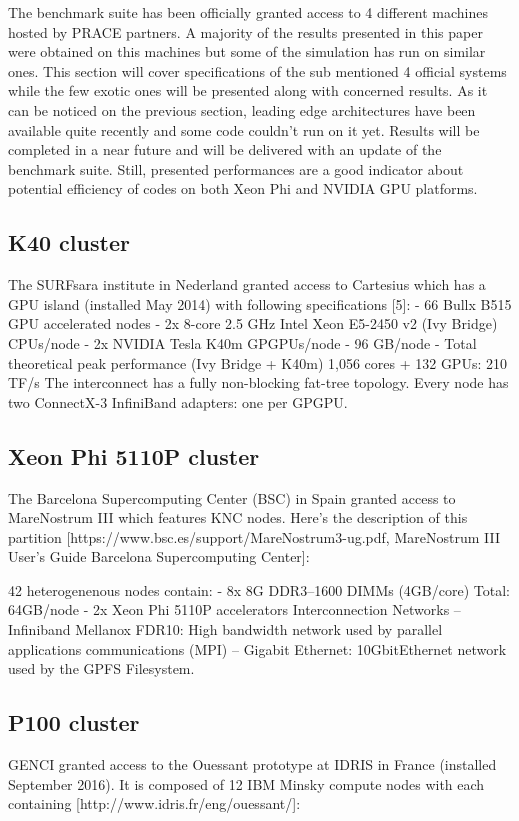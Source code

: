 The benchmark suite has been officially granted access to 4 different machines hosted by PRACE partners. A majority of the results presented in this paper were obtained on this machines but some of the simulation has run on similar ones. This section will cover specifications of the sub mentioned 4 official systems while the few exotic ones will be presented along with concerned results.
As it can be noticed on the previous section, leading edge architectures have been available quite recently and some code couldn't run on it yet. Results will be completed in a near future and will be delivered with an update of the benchmark suite. Still, presented performances are a good indicator about potential efficiency of codes on both Xeon Phi and NVIDIA GPU platforms.

\subsection{K40 cluster}
The SURFsara institute in Nederland granted access to Cartesius which has a GPU island (installed May 2014) with following specifications [5]:
 - 66 Bullx B515 GPU accelerated nodes
  - 2x 8-core 2.5 GHz Intel Xeon E5-2450 v2 (Ivy Bridge) CPUs/node
  - 2x NVIDIA Tesla K40m GPGPUs/node
  - 96 GB/node
 - Total theoretical peak performance (Ivy Bridge + K40m) 1,056 cores + 132 GPUs: 210 TF/s
The interconnect has a fully non-blocking fat-tree topology. Every node has two ConnectX-3 InfiniBand adapters: one per GPGPU.

\subsection{Xeon Phi 5110P cluster}
The Barcelona Supercomputing Center (BSC) in Spain granted access to MareNostrum III which features KNC nodes. Here's the description of this partition [https://www.bsc.es/support/MareNostrum3-ug.pdf, MareNostrum III User’s Guide Barcelona Supercomputing Center]:

42 heterogenenous nodes contain:
 - 8x 8G DDR3–1600 DIMMs (4GB/core) Total: 64GB/node
 - 2x Xeon Phi 5110P accelerators
Interconnection Networks
– Infiniband Mellanox FDR10: High bandwidth network used by parallel applications communications
(MPI)
– Gigabit Ethernet: 10GbitEthernet network used by the GPFS Filesystem.


\subsection{P100 cluster}
GENCI granted access to the Ouessant prototype at IDRIS in France (installed September 2016). It is composed of 12 IBM Minsky compute nodes with each containing [http://www.idris.fr/eng/ouessant/]:

